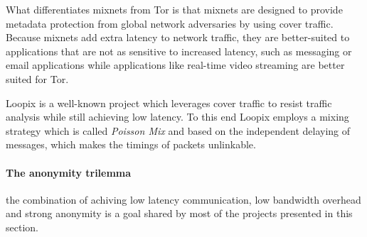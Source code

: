 What differentiates mixnets from Tor is that mixnets are designed to provide
metadata protection from global network adversaries by using cover traffic.
Because mixnets add extra latency to network traffic, they are better-suited to
applications that are not as sensitive to increased latency, such as messaging
or email applications while applications like real-time video streaming are
better suited for Tor.

Loopix \cite{loopix} is a well-known project which leverages cover traffic to
resist traffic analysis while still achieving low latency. To this end Loopix
employs a mixing strategy which is called \textit{Poisson Mix} and based on the
independent delaying of messages, which makes the timings of packets unlinkable.

\paragraph{The anonymity trilemma } \cite{AnonymityTrilemma} the combination of achiving low latency
communication, low bandwidth overhead and strong anonymity is a goal shared by
most of the projects presented in this section.

